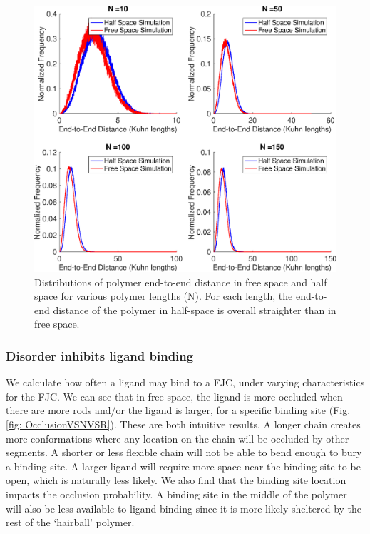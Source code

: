 \documentclass[../../AdvancementSummary.tex]{subfiles}
\begin{document}
\begin{figure}[H]
	\begin{center}
		\includegraphics[width=0.8\linewidth]{ResultsFigures/General/ReeDistributionHalfVSFreeSim.eps}
		\caption{Distributions of polymer end-to-end distance in free space and half space for various polymer lengths (N). For each length, the end-to-end distance of the polymer in half-space is overall straighter than in free space.\label{fig: ReeHalfVSFree}}
	\end{center}
\end{figure}

\subsubsection{Disorder inhibits ligand binding}

We calculate how often a ligand may bind to a FJC, under varying characteristics for the FJC. We can see that in free space, the ligand is more occluded when there are more rods and/or the ligand is larger, for a specific binding site (Fig. \ref{fig: OcclusionVSNVSR}). These are both intuitive results. A longer chain creates more conformations where any location on the chain will be occluded by other segments. A shorter or less flexible chain will not be able to bend enough to bury a binding site. A larger ligand will require more space near the binding site to be open, which is naturally less likely.
We also find that the binding site location impacts the occlusion probability. A binding site in the middle of the polymer will also be less available to ligand binding since it is more likely sheltered by the rest of the `hairball' polymer. 
\end{document}

